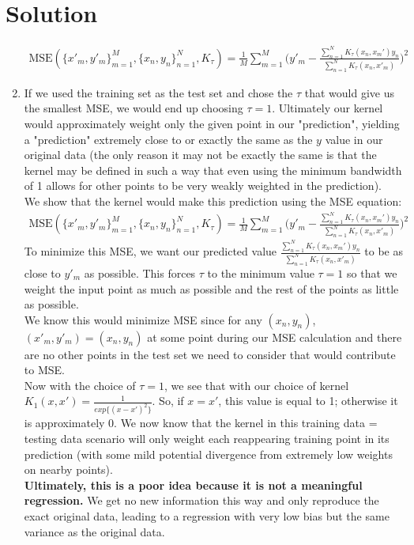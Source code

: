 \documentclass[submit]{harvardml}
\newenvironment{solution}
  {\color{blue}\section*{Solution}}
{}
\begin{document}
\begin{solution}
\begin{enumerate}
    \begin{align*}
        \text{MSE}(\{x'_m,y'_m\}_{m=1}^M, \{x_n,y_n\}_{n=1}^N, K_{\tau}) = \frac{1}{M}\sum_{m=1}^M \Bigg(y'_m - \frac{\sum_{n=1}^N K_{\tau}(x_n, x_m')y_n}{\sum_{n=1}^N K_{\tau}(x_n, x'_m)} \Bigg)^2
    \end{align*}
    \item If we used the training set as the test set and chose the $\tau$ that would give us the smallest MSE, we would end up choosing $\tau = 1$. Ultimately our kernel would approximately weight only the given point in our "prediction", yielding a "prediction" extremely close to or exactly the same as the $y$ value in our original data (the only reason it may not be exactly the same is that the kernel may be defined in such a way that even using the minimum bandwidth of 1 allows for other points to be very weakly weighted in the prediction).\\
    We show that the kernel would make this prediction using the MSE equation:
    \begin{align*}
        \text{MSE}(\{x'_m,y'_m\}_{m=1}^M, \{x_n,y_n\}_{n=1}^N, K_{\tau}) = \frac{1}{M}\sum_{m=1}^M \Bigg(y'_m - \frac{\sum_{n=1}^N K_{\tau}(x_n, x_m')y_n}{\sum_{n=1}^N K_{\tau}(x_n, x'_m)} \Bigg)^2
    \end{align*}
    To minimize this MSE, we want our predicted value  $\frac{\sum_{n=1}^N K_{\tau}(x_n, x_m')y_n}{\sum_{n=1}^N K_{\tau}(x_n, x'_m)}$ to be as close to $y'_m$ as possible. This forces $\tau$ to the minimum value $\tau = 1$ so that we weight the input point as much as possible and the rest of the points as little as possible.\\
    
    We know this would minimize MSE since for any $(x_n, y_n)$, $(x'_m, y'_m) = (x_n, y_n)$ at some point during our MSE calculation and there are no other points in the test set we need to consider that would contribute to MSE.\\

    Now with the choice of $\tau = 1$, we see that with our choice of kernel $K_1(x, x') = \frac{1}{exp\{(x-x')^2\}}$. So, if $x = x'$, this value is equal to 1; otherwise it is approximately 0. We now know that the kernel in this training data = testing data scenario will only weight each reappearing training point in its prediction (with some mild potential divergence from extremely low weights on nearby points).\\

    \textbf{Ultimately, this is a poor idea because it is not a meaningful regression.} We get no new information this way and only reproduce the exact original data, leading to a regression with very low bias but the same variance as the original data.
     

\end{enumerate}
\end{solution}
\end{document}
